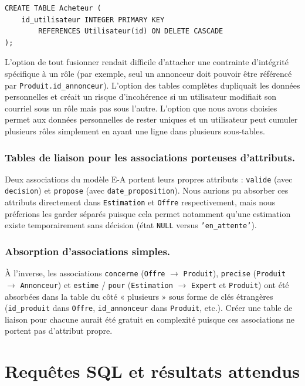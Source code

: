 \documentclass{article}
\theoremstyle{plain}
\theoremstyle{definition}
\begin{document}
\begin{verbatim}
CREATE TABLE Acheteur (
    id_utilisateur INTEGER PRIMARY KEY
        REFERENCES Utilisateur(id) ON DELETE CASCADE
);
\end{verbatim}
 
L'option de tout fusionner rendait difficile d'attacher une contrainte d'intégrité
spécifique à un rôle (par exemple, seul un annonceur doit pouvoir être
référencé par \texttt{Produit.id\_annonceur}). L'option des tables complètes dupliquait
les données personnelles et créait un risque d'incohérence si un
utilisateur modifiait son courriel sous un rôle mais pas sous l'autre. L'option que nous avons choisies permet aux données personnelles de rester
uniques et un utilisateur peut cumuler plusieurs rôles simplement en
ayant une ligne dans plusieurs sous-tables.
 
\subsubsection*{Tables de liaison pour les associations porteuses d'attributs.}
Deux associations du modèle E-A portent leurs propres attributs :
\texttt{valide} (avec \texttt{decision}) et \texttt{propose} (avec
\texttt{date\_proposition}). Nous aurions pu absorber ces attributs
directement dans \texttt{Estimation} et \texttt{Offre} respectivement,
mais nous préferions les garder séparés puisque cela permet notamment qu'une
estimation existe temporairement sans décision (état \texttt{NULL} versus
\texttt{'en\_attente'}).
 
\subsubsection*{Absorption d'associations simples.} À l'inverse, les
associations \texttt{concerne} (\texttt{Offre} $\to$ \texttt{Produit}),
\texttt{precise} (\texttt{Produit} $\to$ \texttt{Annonceur}) et
\texttt{estime} / \texttt{pour} (\texttt{Estimation} $\to$ \texttt{Expert}
et \texttt{Produit}) ont été absorbées dans la table du côté
« plusieurs » sous forme de clés étrangères
(\texttt{id\_produit} dans \texttt{Offre},
\texttt{id\_annonceur} dans \texttt{Produit}, etc.).
Créer une table de liaison pour chacune aurait été gratuit en complexité
puisque ces associations ne portent pas d'attribut propre.

\pagebreak
\section*{Requêtes SQL et résultats attendus}
 
\end{document}
